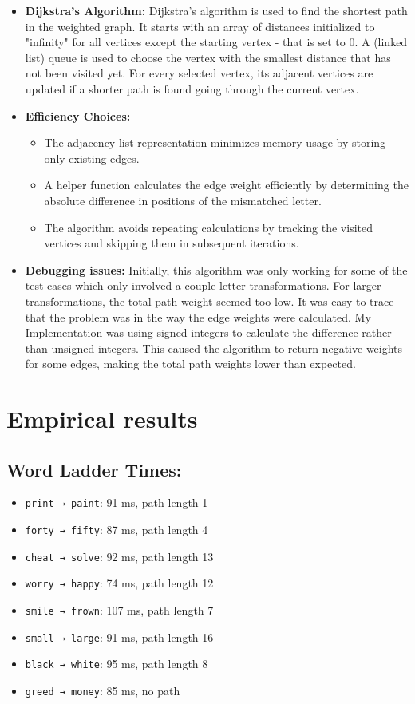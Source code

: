\documentclass{article}
\begin{document}
\begin{itemize}
\begin{itemize}
    \item \textbf{Dijkstra's Algorithm:} 
    Dijkstra's algorithm is used to find the shortest path in the weighted graph. It starts with an array of distances initialized to "infinity" for all vertices except the starting vertex - that is set to 0. A (linked list) queue is used to choose the vertex with the smallest distance that has not been visited yet. For every selected vertex, its adjacent vertices are updated if a shorter path is found going through the current vertex.

    \item \textbf{Efficiency Choices:} 
    \begin{itemize}
        \item The adjacency list representation minimizes memory usage by storing only existing edges.
        \item A helper function calculates the edge weight efficiently by determining the absolute difference in positions of the mismatched letter.
        \item The algorithm avoids repeating calculations by tracking the visited vertices and skipping them in subsequent iterations.
    \end{itemize}
    \item \textbf{Debugging issues:} 
    Initially, this algorithm was only working for some of the test cases which only involved a couple letter transformations. For larger transformations, the total path weight seemed too low. It was easy to trace that the problem was in the way the edge weights were calculated. My Implementation was using signed integers to calculate the difference rather than unsigned integers. This caused the algorithm to return negative weights for some edges, making the total path weights lower than expected. 
\end{itemize}
\end{itemize}

\section*{Empirical results}

\subsection*{Word Ladder Times:}
\begin{itemize}
    \item \texttt{print → paint}: 91 ms, path length 1
    \item \texttt{forty → fifty}: 87 ms, path length 4
    \item \texttt{cheat → solve}: 92 ms, path length 13
    \item \texttt{worry → happy}: 74 ms, path length 12
    \item \texttt{smile → frown}: 107 ms, path length 7
    \item \texttt{small → large}: 91 ms, path length 16
    \item \texttt{black → white}: 95 ms, path length 8
    \item \texttt{greed → money}: 85 ms, no path
\end{itemize}
\end{document}
